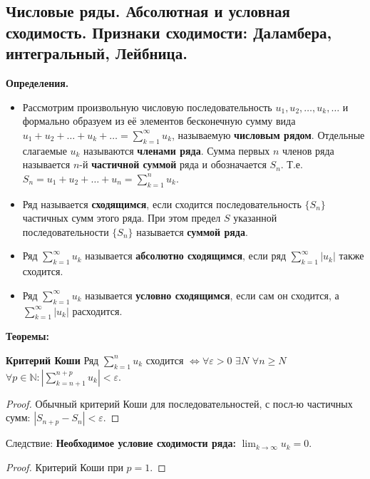 \subsection{Числовые ряды. Абсолютная и условная сходимость. Признаки сходимости: Даламбера, интегральный, Лейбница.}

\textbf{Определения.}
\begin{itemize}
    \item Рассмотрим произвольную числовую последовательность $u_1,u_2,\dots,u_k,\dots$ и формально
    образуем из её элементов бесконечную сумму вида
    $u_1 +u_2 +\dots+u_k +\dots= \displaystyle \sum_{k=1}^{\infty}u_k$, называемую \textbf{числовым рядом}.
    Отдельные слагаемые $u_k$ называются \textbf{членами ряда}.
    Сумма первых $n$ членов ряда называется $n$-й \textbf{частичной суммой} ряда и обозначается $S_n$.
    Т.е. $S_n =u_1 +u_2 +\dots+u_n = \displaystyle \sum_{k=1}^n u_k$.
    \item Ряд называется \textbf{сходящимся}, если сходится последовательность $\{S_n\}$ частичных сумм этого ряда.
    При этом предел $S$ указанной последовательности $\{S_n\}$ называется \textbf{суммой ряда}.
    
    \item Ряд $\displaystyle \sum_{k=1}^{\infty}u_k$ называется \textbf{абсолютно сходящимся}, если ряд $\displaystyle \sum_{k=1}^{\infty}|u_k|$ также сходится.

    \item Ряд $\displaystyle \sum_{k=1}^{\infty}u_k$ называется \textbf{условно сходящимся}, если сам он сходится, а $\displaystyle \sum_{k=1}^{\infty}|u_k|$ расходится.
\end{itemize}

\textbf{Теоремы:}

\textbf{Критерий Коши} Ряд $\displaystyle \sum_{k=1}^n u_k$ сходится $\iff \forall \varepsilon > 0$ $\exists N$ $\forall n \geq N$ $ \forall p \in \mathbb{N} : \displaystyle \left|\sum_{k=n+1}^{n+p} u_k\right| < \varepsilon$.

\begin{proof}
    Обычный критерий Коши для последовательностей, с посл-ю частичных сумм: $|S_{n+p} - S_n| < \varepsilon$.
\end{proof}

Следствие: \textbf{Необходимое условие сходимости ряда:} $\lim_{k\rightarrow\infty} u_k=0$.

\begin{proof}
    Критерий Коши при $p = 1$.
\end{proof}

